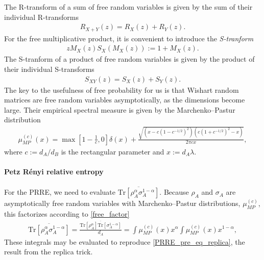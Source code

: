 \documentclass[a4paper,11pt]{article}
\newcommand{\Tr}{\text{Tr}}
\begin{document}
The R-transform of a sum of free random variables is given by the sum of their individual R-transforms
\begin{align}
    R_{X+Y}(z) =  R_{X}(z) + R_{Y}(z) .
\end{align}
For the free multiplicative product, it is convenient to introduce the \textit{S-tranform}
\begin{align}
    z M_X(z) S_X(M_X(z)) := 1 + M_X(z) .
    \label{stransform_def}
\end{align}
The S-tranform of a product of free random variables is given by the product of their individual S-transforms
\begin{align}
    S_{XY}(z) =  S_{X}(z) + S_{Y}(z) .
\end{align}
The key to the usefulness of free probability for us is that Wishart random matrices are free random variables asymptotically, as the dimensions become large. Their empirical spectral measure is given by the Marchenko–Pastur distribution
\begin{align}
    \mu^{(c)}_{MP}(x) = \max\left[1- \frac{1}{c},0 \right]\delta(x)+ \frac{\sqrt{(x-c(1-{c}^{-1/2})^2)(c(1+{c}^{-1/2})^2-x)} }{2\pi c x},
\end{align}
where $c :=d_A/d_B$ is the rectangular parameter and $x := d_A \lambda$.

\paragraph{Petz R\'enyi relative entropy}
For the PRRE, we need to evaluate $\overline{\Tr\left[\rho_A^{\alpha}\sigma^{1-\alpha}_A\right]}$. Because $\rho_A$ and $\sigma_A$ are asymptotically free random variables with Marchenko–Pastur distributions, $\mu^{(c)}_{MP}$, this factorizes according to \eqref{free_factor} 
\begin{align}
    \overline{\Tr\left[\rho_A^{\alpha}\sigma^{1-\alpha}_A\right]} = \frac{\overline{\Tr\left[\rho_A^{\alpha}\right]\Tr\left[\sigma^{1-\alpha}_A\right]}}{d_A} = \int \mu^{(c)}_{MP}(x) x^{\alpha}\int \mu^{(c)}_{MP}(x) x^{1-\alpha},
\end{align}
These integrals may be evaluated to reproduce \eqref{PRRE_pre_eq_replica}, the result from the replica trick.
\end{document}
